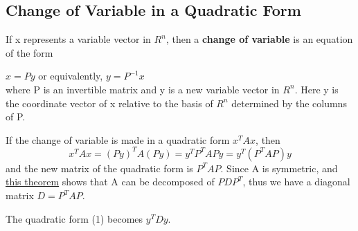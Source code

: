 \subsection{Change of Variable in a Quadratic Form}
\begin{definition}
    If x represents a variable vector in \(R^n\), then a \textbf{change of variable} is an equation of the form

    \(x = Py\) or equivalently, \(y = P^{-1}x\)  \\
    where P is an invertible matrix and y is a new variable vector in \(R^n\). Here y is the coordinate vector of x relative to the basis of \(R^n\) determined by the columns of P. 
\end{definition}
\begin{remark}
    If the change of variable is made in a quadratic form \(x^T Ax\), then
    \[
        x^TAx = (Py)^T A (Py) = y^T P^T APy = y^T(P^TAP)y  \tag{1}
    \]
    and the new matrix of the quadratic form is \(P^T AP\). 
    Since A is symmetric, and \hyperref[theorem: 7.1.2]{this theorem} shows that A can be decomposed of \(P DP^T\), thus we have a diagonal matrix \(D = P^T AP\). 

    The quadratic form (1) becomes \(y^TDy\). 
\end{remark}

